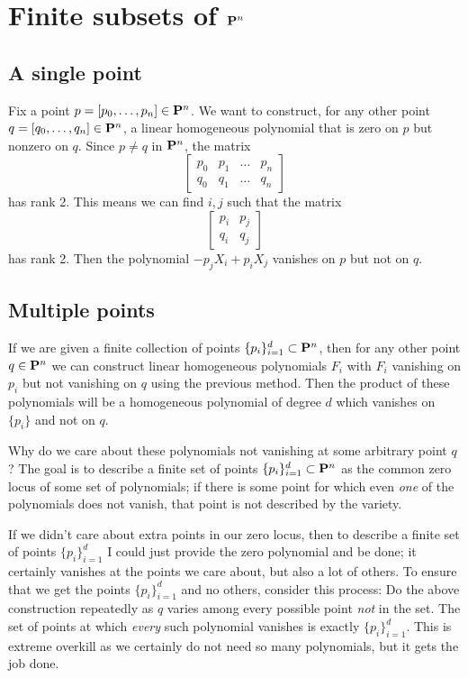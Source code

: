 

\section{Finite subsets of $\P^n$}
\subsection{A single point}
Fix a point $p=[p_0,\ldots,p_n]\in\P^n$. We want to construct, for any other point $q=[q_0,\ldots,q_n]\in\P^n$, a linear homogeneous polynomial that is zero on $p$ but nonzero on $q$. Since $p\neq q$ in $\P^n$, the matrix
\[
\begin{bmatrix}
    p_0 & p_1 & \dots  & p_n \\
    q_0 & q_1 & \dots  & q_n
\end{bmatrix}
\]
has rank 2. This means we can find $i, j$ such that the matrix
\[
\begin{bmatrix}
    p_i & p_j \\
    q_i & q_j
\end{bmatrix}
\]
has rank 2. Then the polynomial $-p_jX_i + p_iX_j$ vanishes on $p$ but not on $q$.
\subsection{Multiple points}
If we are given a finite collection of points $\{p_i\}_{i=1}^d\subset\P^n$, then for any other point $q\in\P^n$ we can construct linear homogeneous polynomials $F_i$ with $F_i$ vanishing on $p_i$ but not vanishing on $q$ using the previous method. Then the product of these polynomials will be a homogeneous polynomial of degree $d$ which vanishes on $\{p_i\}$ and not on $q$.

Why do we care about these polynomials not vanishing at some arbitrary point $q$? The goal is to describe a finite set of points $\{p_i\}_{i=1}^d\subset\P^n$ as the common zero locus of some set of polynomials; if there is some point for which even \emph{one} of the polynomials does not vanish, that point is not described by the variety.

If we didn't care about extra points in our zero locus, then to describe a finite set of points $\{p_i\}_{i=1}^d$ I could just provide the zero polynomial and be done; it certainly vanishes at the points we care about, but also a lot of others. To ensure that we get the points $\{p_i\}_{i=1}^d$ and no others, consider this process: Do the above construction repeatedly as $q$ varies among every possible point \emph{not} in the set. The set of points at which \emph{every} such polynomial vanishes is exactly $\{p_i\}_{i=1}^d$. This is extreme overkill as we certainly do not need so many polynomials, but it gets the job done.

